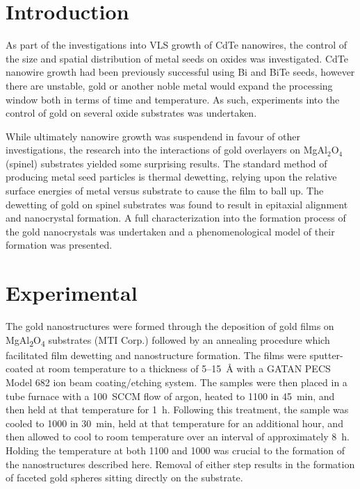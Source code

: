 \section{Introduction}
As part of the investigations into VLS growth of CdTe nanowires, the control of the size and spatial distribution of metal seeds on oxides was investigated.
CdTe nanowire growth had been previously successful using Bi and BiTe seeds, however there are unstable, gold or another noble metal would expand the processing window both in terms of time and temperature.
As such, experiments into the control of gold on several oxide substrates was undertaken.

While ultimately nanowire growth was suspendend in favour of other investigations, the research into the interactions of gold overlayers on MgAl\(_2\)O\(_4\) (spinel) substrates yielded some surprising results.
The standard method of producing metal seed particles is thermal dewetting, relying upon the relative surface energies of metal versus substrate to cause the film to ball up.
The dewetting of gold on spinel substrates was found to result in epitaxial alignment and nanocrystal formation.
A full characterization into the formation process of the gold nanocrystals was undertaken and a phenomenological model of their formation was presented.

\section{Experimental}
The gold nanostructures were formed through the deposition of gold films on MgAl\textsubscript{2}O\textsubscript{4} substrates (MTI Corp.) followed by an annealing procedure which facilitated film dewetting and nanostructure formation.
The films were sputter-coated at room temperature to a thickness of 5--15~\AA{} with a GATAN PECS Model 682 ion beam coating/etching system.
The samples were then placed in a tube furnace with a 100~SCCM flow of argon, heated to 1100\celsius{} in 45~min, and then held at that temperature for 1~h.
Following this treatment, the sample was cooled to 1000\celsius{} in 30~min, held at that temperature for an additional hour, and then allowed to cool to room temperature over an interval of approximately 8~h.
Holding the temperature at both 1100 and 1000\celsius{} was crucial to the formation of the nanostructures described here.
Removal of either step results in the formation of faceted gold spheres sitting directly on the substrate.

